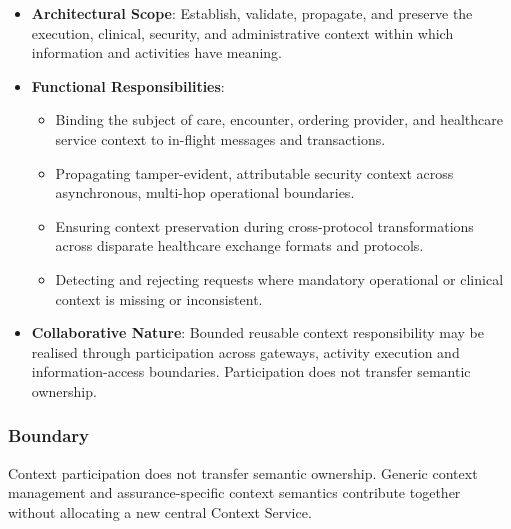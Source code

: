 \begin{itemize}

\item
\textbf{Architectural Scope}: Establish, validate, propagate, and preserve the execution, clinical, security, and administrative context within which information and activities have meaning.



\item
\textbf{Functional Responsibilities}:


\begin{itemize}

\item
Binding the subject of care, encounter, ordering provider, and healthcare service context to in-flight messages and transactions.



\item
Propagating tamper-evident, attributable security context across asynchronous, multi-hop operational boundaries.



\item
Ensuring context preservation during cross-protocol transformations across disparate healthcare exchange formats and protocols.



\item
Detecting and rejecting requests where mandatory operational or clinical context is missing or inconsistent.



\end{itemize}


\item
\textbf{Collaborative Nature}: Bounded reusable context responsibility may be realised through participation across gateways, activity execution and information-access boundaries. Participation does not transfer semantic ownership.



\end{itemize}
\subsubsection*{Boundary}

Context participation does not transfer semantic ownership. Generic context management and assurance-specific context semantics contribute together without allocating a new central Context Service.

